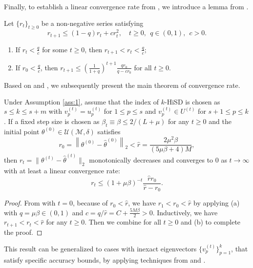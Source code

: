 \documentclass[final]{siamart251216}
\begin{document}
Finally, to establish a linear convergence rate from , we introduce a lemma from \cite[Lemma 3.2]{luo2022convergence}.
\begin{lemma}
Let $\{r_t\}_{t\geqslant 0}$ be a non-negative series satisfying
\begin{equation*}
r_{t+1}\leqslant (1-q)r_t + cr_t^2,\quad t\geq 0,~~q\in(0,1),~~c>0.
\end{equation*}
\begin{enumerate}
\item[(a)]  If $\displaystyle r_{t}<\frac{q}{c}$ for some $t\geqslant 0$, then 
$\displaystyle r_{t+1}<r_t<\frac{q}{c};$
\item[(b)] If $\displaystyle r_{0}<\frac{q}{c}$, then 
$\displaystyle r_{t+1}\leqslant \left(\frac{1}{1+q}\right)^{t+1}\frac{qr_0}{q-cr_0}$ for all $t\geqslant 0$.
\end{enumerate}
\label{lemma:recursion}
\end{lemma}

Based on  and , we subsequently present the main theorem of convergence rate.
\begin{theorem}
\label{thm:convergence}
Under Assumption \ref{ass:1}, assume that the index of $k$-HiSD is chosen as $s\leqslant k\leqslant s+m$ with 
$v_p^{(t)}=u_p^{(t)}$ for $1\leqslant p\leqslant s$ 
and $v_p^{(t)} \in U^{(t)}$ for $s+1\leqslant p\leqslant k$.
If a fixed step size is chosen as $\beta_t \equiv \beta \leqslant {2}/(L+\mu)$ for any $t\geqslant 0$ and
the initial point $\theta^{(0)} \in \mathcal{U}(\mathcal{M}, \delta)$ satisfies
\begin{equation}
r_0=\left\|\theta^{(0)}-\hat{\theta}^{(0)}\right\|_2<
\hat{r}=\frac{2\mu^2 \beta}{(5\mu\beta+4)M},
\end{equation}
then $r_t=\|\theta^{(t)}-\hat{\theta}^{(t)}\|_2$ monotonically decreases and converges to $0$ as $t\rightarrow \infty$ with at least a linear convergence rate: 
\begin{equation}
r_t\leqslant \left(1+\mu\beta\right)^{-t} \frac{\hat{r}r_0}{\hat{r}-r_0}.
\end{equation}
\end{theorem}
\begin{proof}
From  with $t=0$,
because of 
$r_0<\hat{r}$, we have 
$r_{1}<r_0<\hat{r}$ by applying 
 (a) with $q=\mu\beta\in(0,1)$ and $c=q/\hat{r}=C+\frac{5M\beta}{2}>0$.
Inductively, we have $r_{t+1} < r_{t} <\hat{r}$ for any $t \geqslant 0$.
Then we combine  for all $t\geqslant 0$ and  (b) to complete the proof.
\end{proof}
\begin{remark}
This result can be generalized to cases with inexact eigenvectors $\{v_p^{(t)}\}_{p=1}^k$, that  satisfy specific accuracy bounds, by applying techniques from  and \cite{luo2022convergence}. 
\end{remark}
\end{document}
